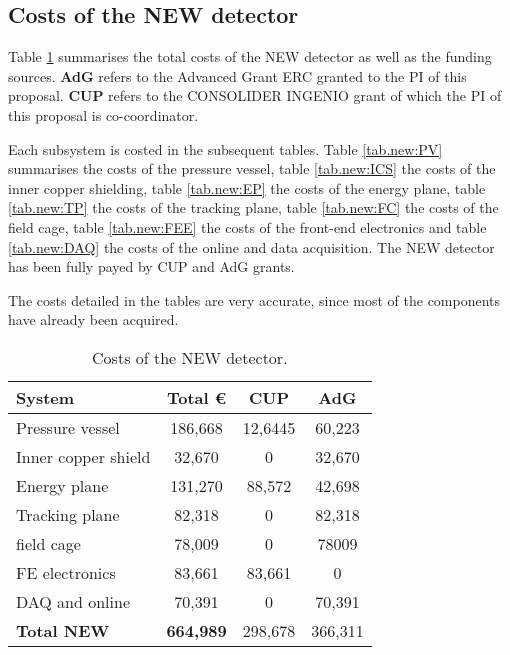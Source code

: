 \subsection{Costs of the NEW detector}
Table \ref{tab.new:DET} summarises the total costs of the NEW detector as well as the funding sources. {\bf AdG} refers to the Advanced Grant ERC granted to the PI of this proposal. {\bf CUP} refers to the CONSOLIDER INGENIO grant of which the PI of this proposal is co-coordinator.

Each subsystem is costed in the subsequent tables. Table \ref{tab.new:PV} summarises the costs of the pressure vessel, 
table \ref{tab.new:ICS} the costs of the inner copper shielding,
table \ref{tab.new:EP} the costs of the energy plane,
table \ref{tab.new:TP} the costs of the tracking plane,
table \ref{tab.new:FC} the costs of the field cage,
table \ref{tab.new:FEE} the costs of the front-end electronics and
table \ref{tab.new:DAQ} the costs of the online and data acquisition. The NEW detector has
been fully payed by CUP and AdG grants.

The costs detailed in the tables are very accurate, since most of the components have already been acquired. 
  
\begin{table}[h!]
\begin{center}
\begin{tabular}{|l|c|c|c|}
\hline
 System & Total \euro & CUP & AdG  \\
 \hline
 Pressure vessel 	& 186,668 &	12,6445 &	60,223 \\
Inner copper shield	& 32,670	& 0 &	32,670 \\
Energy plane	& 131,270 &	88,572 &	42,698 \\
Tracking plane	& 82,318 &	0 &	82,318 \\
field cage	& 78,009 &	0 &	78009 \\
FE electronics &	83,661 &	83,661 &	0\\
DAQ and online &	70,391 &	0 &	70,391 \\
 \hline
{\bf Total NEW} &	{\bf 664,989 }& 	298,678 & 	366,311 \\	
 \hline\hline
\end{tabular}  
\caption{Costs of the NEW detector.}
\label{tab.new:DET}
\end{center}
\end{table} 

